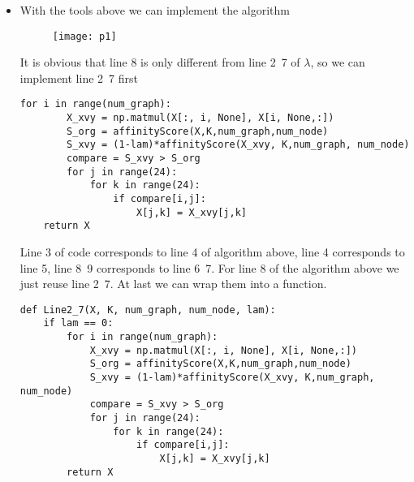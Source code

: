 \documentclass[11pt, oneside]{article}   	%
\begin{document}
\begin{itemize}
\item With the tools above we can implement the algorithm
\begin{figure}[H]
   \centering
   \texttt{[image: p1]} %
\end{figure}
It is obvious that line 8 is only different from line 2~7 of $\lambda$, so we can implement line 2~7 first
\begin{lstlisting}[language={[ANSI]C},keywordstyle=\color{blue!70},commentstyle=\color{red!50!green!50!blue!50},frame=shadowbox, rulesepcolor=\color{red!20!green!20!blue!20}] 
    for i in range(num_graph):
        X_xvy = np.matmul(X[:, i, None], X[i, None,:])
        S_org = affinityScore(X,K,num_graph,num_node)
        S_xvy = (1-lam)*affinityScore(X_xvy, K,num_graph, num_node)
        compare = S_xvy > S_org
        for j in range(24):
            for k in range(24):
                if compare[i,j]:
                    X[j,k] = X_xvy[j,k]
    return X
\end{lstlisting}
Line 3 of code corresponds to line 4 of algorithm above, line 4 corresponds to line 5, line 8~9 corresponds to line 6~7. For line 8 of the algorithm above we just reuse line 2~7. At last we can wrap them into a function.
\begin{lstlisting}[language={[ANSI]C},keywordstyle=\color{blue!70},commentstyle=\color{red!50!green!50!blue!50},frame=shadowbox, rulesepcolor=\color{red!20!green!20!blue!20}] 
def Line2_7(X, K, num_graph, num_node, lam):
    if lam == 0:
        for i in range(num_graph):
            X_xvy = np.matmul(X[:, i, None], X[i, None,:])
            S_org = affinityScore(X,K,num_graph,num_node)
            S_xvy = (1-lam)*affinityScore(X_xvy, K,num_graph, num_node)
            compare = S_xvy > S_org
            for j in range(24):
                for k in range(24):
                    if compare[i,j]:
                        X[j,k] = X_xvy[j,k]
        return X


\end{lstlisting}
\end{itemize}
\end{document}
